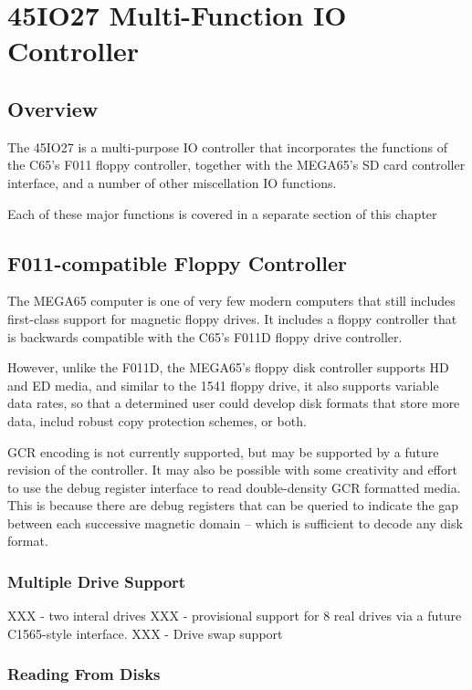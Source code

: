 \chapter{45IO27 Multi-Function IO Controller}

\section{Overview}

The 45IO27 is a multi-purpose IO controller that incorporates the functions of the
C65's F011 floppy controller, together with the MEGA65's SD card controller interface,
and a number of other miscellation IO functions.

Each of these major functions is covered in a separate section of this chapter

\section{F011-compatible Floppy Controller}

The MEGA65 computer is one of very few modern computers that still
includes first-class support for magnetic floppy drives.  It includes
a floppy controller that is backwards compatible with the C65's F011D
floppy drive controller.

However, unlike the F011D, the MEGA65's
floppy disk controller supports HD and ED media, and similar to the
1541 floppy drive, it also supports variable data rates, so that a
determined user could develop disk formats that store more data,
includ robust copy protection schemes, or both.

GCR encoding is not currently supported, but may be supported by a
future revision of the controller.  It may also be possible with some
creativity and effort to use the debug register interface to read
double-density GCR formatted media.  This is because there are debug
registers that can be queried to indicate the gap between each
successive magnetic domain -- which is sufficient to decode any disk
format. 

\subsection{Multiple Drive Support}

XXX - two interal drives
XXX - provisional support for 8 real drives via a future C1565-style
interface.
XXX - Drive swap support

\subsection{Reading From Disks}

